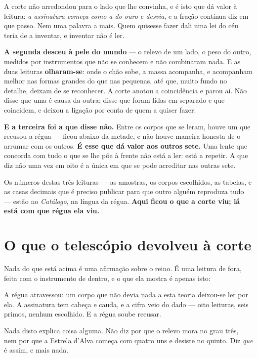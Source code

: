 \documentclass[livro.tex]{subfiles}
\begin{document}
A corte não arredondou para o lado que lhe convinha, e é isto que dá valor à leitura:
\emph{a assinatura começa como a do ouro e desvia}, e a fração contínua diz em que passo.
Nem uma palavra a mais. Quem quisesse fazer dali uma lei do céu teria de a inventar, e
inventar não é ler.

\medskip
\noindent \textbf{A segunda desceu à pele do mundo} --- o relevo de um lado, o peso do
outro, medidos por instrumentos que não se conhecem e não combinaram nada. E as duas
leituras \textbf{olharam-se}: onde o chão sobe, a massa acompanha, e acompanham melhor
nas formas grandes do que nas pequenas, até que, muito fundo no detalhe, deixam de se
reconhecer. A corte anotou a coincidência e parou aí. Não disse que uma é causa da
outra; disse que foram lidas em separado e que coincidem, e deixou a ligação por conta de
quem a quiser fazer.

\medskip
\noindent \textbf{E a terceira foi a que disse não.} Entre os corpos que se leram, houve
um que recusou a régua --- ficou abaixo da metade, e não houve maneira honesta de o
arrumar com os outros. \textbf{É esse que dá valor aos outros sete.} Uma lente que
concorda com tudo o que se lhe põe à frente não está a ler: está a repetir. A que diz não
uma vez em oito é a única em que se pode acreditar nas outras sete.

\medskip
\noindent Os números destas três leituras --- as amostras, os corpos escolhidos, as
tabelas, e as casas decimais que é preciso publicar para que outro alguém reproduza
tudo --- estão no \emph{Catálogo}, na língua da régua. \textbf{Aqui ficou o que a
corte viu; lá está com que régua ela viu.}

\section{O que o telescópio devolveu à corte}

Nada do que está acima é uma afirmação sobre o reino. É uma leitura de fora,
feita com o instrumento de dentro, e o que ela mostra é apenas isto:

A régua atravessou: um corpo que não devia nada a esta teoria deixou-se ler por
ela. A assinatura tem cabeça e cauda, e a cifra veio do dado --- oito leituras,
seis primos, nenhum escolhido. E a régua soube recusar.

\medskip
\noindent Nada disto explica coisa alguma. Não diz por que o relevo mora no grau
três, nem por que a Estrela d'Alva começa com quatro uns e desiste no quinto. Diz
\emph{que} é assim, e mais nada.
\end{document}
